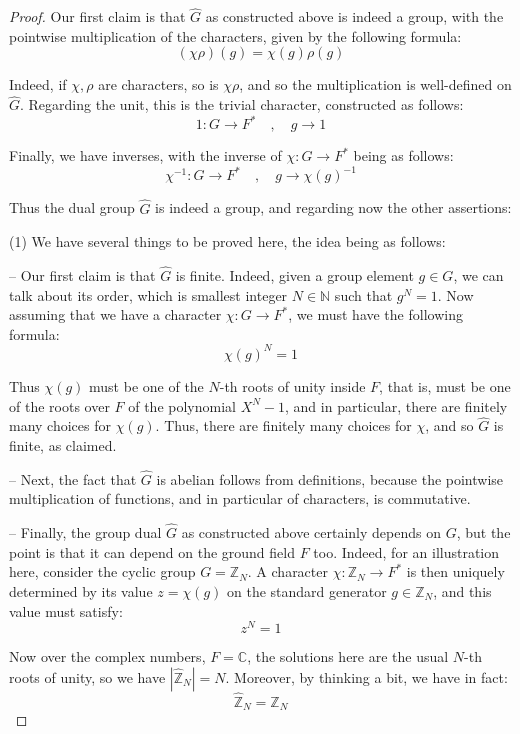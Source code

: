 \documentclass[12pt]{amsbook}
\begin{document}
\begin{proof}
Our first claim is that $\widehat{G}$ as constructed above is indeed a group, with the pointwise multiplication of the characters, given by the following formula:
$$(\chi\rho)(g)=\chi(g)\rho(g)$$

Indeed, if $\chi,\rho$ are characters, so is $\chi\rho$, and so the multiplication is well-defined on $\widehat{G}$. Regarding the unit, this is the trivial character, constructed as follows:
$$1:G\to F^*\quad,\quad 
g\to1$$ 

Finally, we have inverses, with the inverse of $\chi:G\to F^*$ being as follows:
$$\chi^{-1}:G\to F^*\quad,\quad 
g\to\chi(g)^{-1}$$

Thus the dual group $\widehat{G}$ is indeed a group, and regarding now the other assertions:

\medskip

(1) We have several things to be proved here, the idea being as follows:

\medskip

-- Our first claim is that $\widehat{G}$ is finite. Indeed, given a group element $g\in G$, we can talk about its order, which is smallest integer $N\in\mathbb N$ such that $g^N=1$. Now assuming that we have a character $\chi:G\to F^*$, we must have the following formula:
$$\chi(g)^N=1$$

Thus $\chi(g)$ must be one of the $N$-th roots of unity inside $F$, that is, must be one of the roots over $F$ of the polynomial $X^N-1$, and in particular, there are finitely many choices for $\chi(g)$. Thus, there are finitely many choices for $\chi$, and so $\widehat{G}$ is finite, as claimed.

\medskip

-- Next, the fact that $\widehat{G}$ is abelian follows from definitions, because the pointwise multiplication of functions, and in particular of characters, is commutative.

\medskip

-- Finally, the group dual $\widehat{G}$ as constructed above certainly depends on $G$, but the point is that it can depend on the ground field $F$ too. Indeed, for an illustration here, consider the cyclic group $G=\mathbb Z_N$. A character $\chi:\mathbb Z_N\to F^*$ is then uniquely determined by its value $z=\chi(g)$ on the standard generator $g\in\mathbb Z_N$, and this value must satisfy:
$$z^N=1$$

Now over the complex numbers, $F=\mathbb C$, the solutions here are the usual $N$-th roots of unity, so we have $|\widehat{\mathbb Z}_N|=N$. Moreover, by thinking a bit, we have in fact:
$$\widehat{\mathbb Z}_N=\mathbb Z_N$$


\end{proof}
\end{document}
